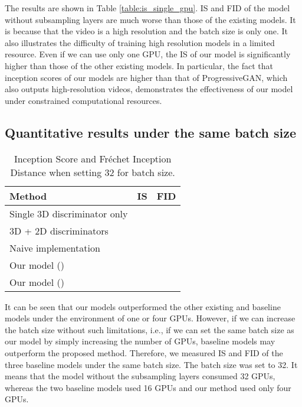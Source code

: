 \documentclass[twocolumn]{svjour3}
\def\Table#1{Table \ref{table:#1}}
\begin{document}
The results are shown in \Table{is_single_gpu}.
IS and FID of the model without subsampling layers are much worse than
those of the existing models.
It is because that the video is a high resolution and the batch size is only one.
It also illustrates the difficulty of training high resolution models
in a limited resource.
Even if we can use only one GPU, the IS of our model is
significantly higher than those of the other existing models.
In particular, the fact that inception scores of our models
are higher than that of ProgressiveGAN,
which also outputs high-resolution videos,
demonstrates the effectiveness of our model under constrained computational resources.


\subsection{Quantitative results under the same batch size}
\label{sec:exp_comparison_same_bs}
\begin{table}[t]
\centering
{\renewcommand{\arraystretch}{1.2}
\begin{tabular}{lll}
Method & IS & FID \\ \hline \hline
Single 3D discriminator only &  &  \\
3D + 2D discriminators &  &  \\
Naive implementation &  &  \\ \hline
Our model () &  &  \\
Our model () &  &  \\ \hline
\end{tabular}
}
\caption{Inception Score and Fr\'echet Inception Distance when setting 32 for batch size.}
\label{table:is_bs_32}
\vspace{-10pt}
\end{table}











It can be seen that our models outperformed the other existing and baseline models
under the environment of one or four GPUs.
However, if we can increase the batch size without such limitations,
i.e., if we can set the same batch size as our model by simply increasing the number of GPUs,
baseline models may outperform the proposed method.
Therefore, we measured IS and FID of the three baseline models under the same batch size.
The batch size was set to 32. It means that the model without the subsampling layers consumed 32 GPUs, whereas the two baseline models used 16 GPUs and our method used only four GPUs.
\end{document}

